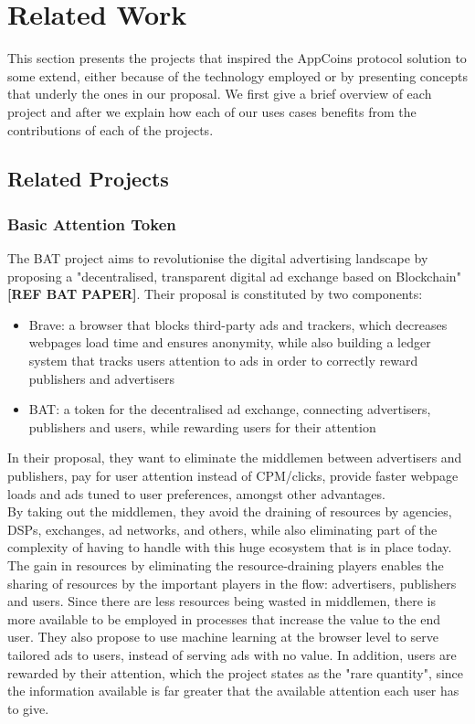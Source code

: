 \section{Related Work}

This section presents the projects that inspired the AppCoins protocol solution to some extend, either because of the technology employed or by presenting concepts that underly the ones in our proposal. We first give a brief overview of each project and after we explain how each of our uses cases benefits from the contributions of each of the projects.

\subsection{Related Projects}
\subsubsection{Basic Attention Token}

The BAT project aims to revolutionise the digital advertising landscape by proposing a "decentralised, transparent digital ad exchange based on Blockchain" \textbf{[REF BAT PAPER]}. Their proposal is constituted by two components:
\begin{itemize}
	\item Brave: a browser that blocks third-party ads and trackers, which decreases webpages load time and ensures anonymity, while also building a ledger system that tracks users attention to ads in order to correctly reward publishers and advertisers
	\item BAT: a token for the decentralised ad exchange, connecting advertisers, publishers and users, while rewarding users for their attention
\end{itemize}

In their proposal, they want to eliminate the middlemen between advertisers and publishers, pay for user attention instead of CPM/clicks, provide faster webpage loads and ads tuned to user preferences, amongst other advantages. \\

By taking out the middlemen, they avoid the draining of resources by agencies, DSPs, exchanges, ad networks, and others, while also eliminating part of the complexity of having to handle with this huge ecosystem that is in place today. The gain in resources by eliminating the resource-draining players enables the sharing of resources by the important players in the flow: advertisers, publishers and users. Since there are less resources being wasted in middlemen, there is more available to be employed in processes that increase the value to the end user. They also propose to use machine learning at the browser level to serve tailored ads to users, instead of serving ads with no value. In addition, users are rewarded by their attention, which the project states as the "rare quantity", since the information available is far greater that the available attention each user has to give. \\

